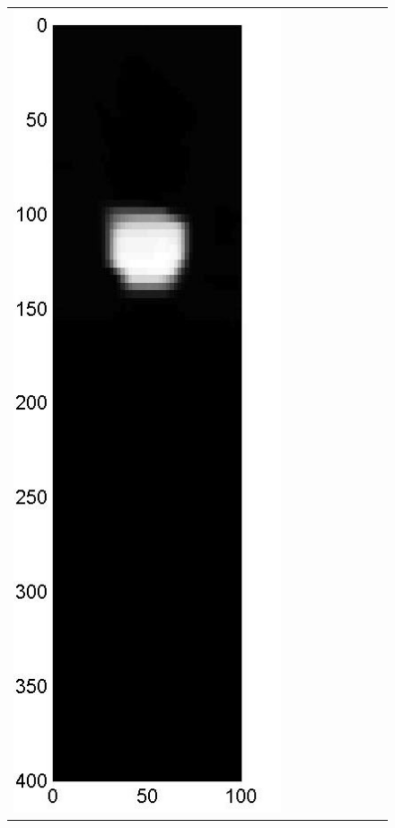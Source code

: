 \documentclass[11pt]{article}
\begin{document}
{\begin{figure}[!h]
\begin{center}
\begin{tabular}{|c|c|c|c|c|c|c|c|c|}
			\includegraphics[width=.9\iwidth]{figures/newFigs/noisy/resultsExp-2-mkTV}
			&

\end{tabular}
\end{center}
\end{figure}}
\end{document}
